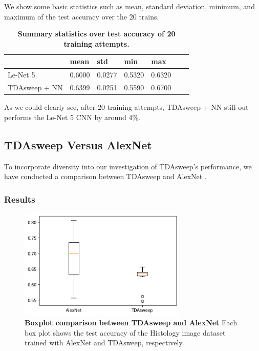 \documentclass{article}
\begin{document}
We show some basic statistics such as mean, standard deviation, minimum, and maximum of the test accuracy over the 20 trains.
\begin{table}[!ht]
\centering
\caption{{\bf Summary statistics over test accuracy of 20 training attempts.}}
\begin{tabular}{|l|l|l|l|l|l|l|}
\hline
\multicolumn{1}{|l|}{} & \multicolumn{1}{|l|}{\bf mean} & \multicolumn{1}{|l|}{\bf std} & \multicolumn{1}{|l|}{\bf min}& \multicolumn{1}{|l|}{\bf max}\\ \hline
Le-Net 5 & 0.6000 & 0.0277 & 0.5320 & 0.6320 \\ \hline
TDAsweep + NN & 0.6399 & 0.0251 & 0.5590 & 0.6700 \\ \hline

\end{tabular}
\label{tda_aug}
\end{table}

As we could clearly see, after 20 training attempts, TDAsweep + NN still out-performs the Le-Net 5 CNN by around 4\%.

\subsection{TDAsweep Versus AlexNet}
To incorporate diversity into our investigation of TDAsweep's performance, we have conducted a comparison between TDAsweep and AlexNet \cite{10.5555/2999134.2999257}.

\subsubsection{Results}

\begin{figure}[!ht]
\centering
\includegraphics[width=8cm]{alex_vs_tdasweep.png}
\caption{{\bf Boxplot comparison between TDAsweep and AlexNet} Each box plot shows the test accuracy of the Histology image dataset trained with AlexNet and TDAsweep, respectively.}
\label{alex_tdasweep}
\end{figure}
\end{document}
